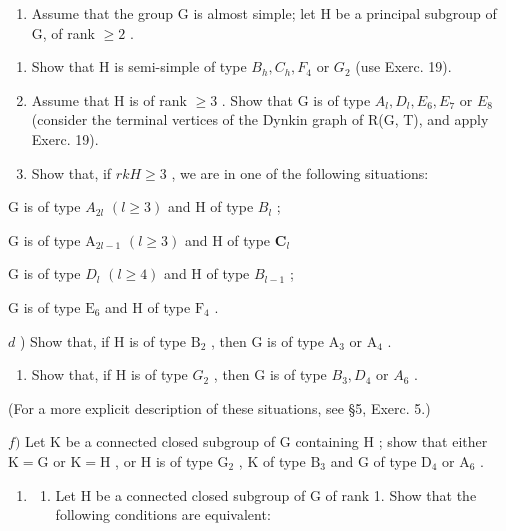 \begin{enumerate}
\def\labelenumi{\arabic{enumi})}
\setcounter{enumi}{19}
\tightlist
\item
  Assume that the group G is almost simple; let H be a principal subgroup of G, of rank \(\geq 2\) .
\end{enumerate}

\begin{enumerate}
\def\labelenumi{\alph{enumi})}
\item
  Show that H is semi-simple of type \(B_{h}, C_{h}, F_{4}\) or \(G_{2}\) (use Exerc. 19).
\item
  Assume that H is of rank \(\geq 3\) . Show that G is of type \(A_{l}, D_{l}, E_{6}, E_{7}\) or \(E_{8}\) (consider the terminal vertices of the Dynkin graph of R(G, T), and apply Exerc. 19).
\item
  Show that, if \(rkH \geq 3\) , we are in one of the following situations:
\end{enumerate}

G is of type \(A_{2l}\) \((l \geq 3)\) and H of type \(B_{l}\) ;

G is of type \(\mathrm{A}_{2l - 1}\) \((l\geq 3)\) and H of type \(\mathbf{C}_l\)

G is of type \(D_{l}\) \((l \geq 4)\) and H of type \(B_{l-1}\) ;

G is of type \(\mathrm{E}_6\) and H of type \(\mathrm{F}_4\) .

\(d\) ) Show that, if H is of type \(\mathrm{B}_2\) , then G is of type \(\mathrm{A}_3\) or \(\mathrm{A}_4\) .

\begin{enumerate}
\def\labelenumi{\alph{enumi})}
\setcounter{enumi}{4}
\tightlist
\item
  Show that, if H is of type \(G_{2}\) , then G is of type \(B_{3}, D_{4}\) or \(A_{6}\) .
\end{enumerate}

(For a more explicit description of these situations, see §5, Exerc. 5.)

\(f)\) Let \(\mathrm{K}\) be a connected closed subgroup of \(\mathrm{G}\) containing \(\mathrm{H}\) ; show that either \(\mathrm{K} = \mathrm{G}\) or \(\mathrm{K} = \mathrm{H}\) , or \(\mathrm{H}\) is of type \(\mathrm{G}_2\) , \(\mathrm{K}\) of type \(\mathrm{B}_3\) and \(\mathrm{G}\) of type \(\mathrm{D}_4\) or \(\mathrm{A}_6\) .

\begin{enumerate}
\def\labelenumi{\arabic{enumi})}
\setcounter{enumi}{20}
\tightlist
\item
  \begin{enumerate}
  \def\labelenumii{\alph{enumii})}
  \tightlist
  \item
    Let H be a connected closed subgroup of G of rank 1. Show that the following conditions are equivalent:
  \end{enumerate}
\end{enumerate}

